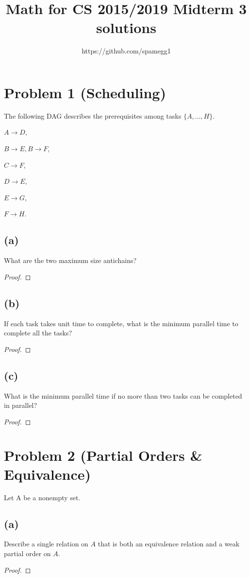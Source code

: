 \documentclass[14pt]{extarticle}
\title{Math for CS 2015/2019 Midterm 3 solutions}
\author{https://github.com/spamegg1}
\begin{document}
\maketitle
\tableofcontents

\section{Problem 1 (Scheduling)}
The following DAG describes the prerequisites among tasks $\{A, \ldots, H \}$.

$A \to D$,

$B \to E, B \to F$,

$C \to F$,

$D \to E$, 

$E \to G$,

$F \to H$.
\subsection{(a)}
What are the two maximum size antichains?
\begin{proof}
\end{proof}

\subsection{(b)}
If each task takes unit time to complete, what is the minimum parallel time to complete all the tasks?
\begin{proof}
\end{proof}

\subsection{(c)}
What is the minimum parallel time if no more than two tasks can be completed in parallel?
\begin{proof}
\end{proof}

\section{Problem 2 (Partial Orders \& Equivalence)}
Let A be a nonempty set.
\subsection{(a)}
Describe a single relation on $A$ that is both an equivalence relation and a weak partial order on $A$.
\begin{proof}
\end{proof}
\end{document}
